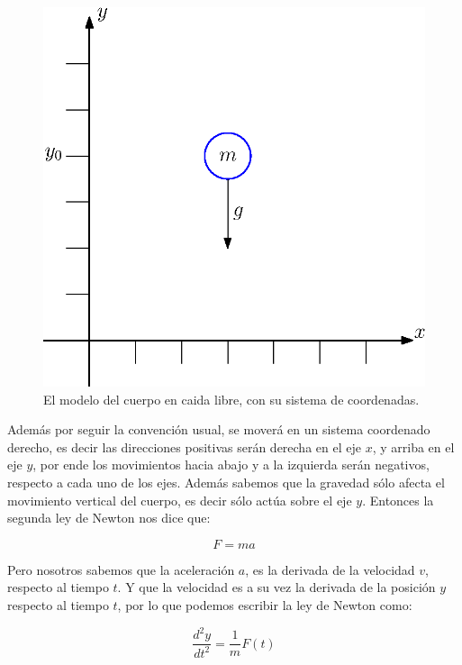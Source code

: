 \begin{figure}
 \centering
 \includegraphics[]{Img/01/cuerpo_caida}
 \caption[Diagrama de cuerpo libre]{ 
 El modelo del cuerpo en caida libre, con su sistema de coordenadas.
 } \label{cida:fig}
\end{figure}

Además por seguir la convención usual, se moverá en un sistema coordenado derecho, es decir las direcciones positivas serán derecha en el eje $x$, y arriba en el eje $y$, por ende los movimientos hacia abajo y a la izquierda serán negativos, respecto a cada uno de los ejes.
Además sabemos que la gravedad sólo afecta el movimiento vertical del cuerpo, es decir sólo actúa sobre el eje $y$.
Entonces la segunda ley de Newton nos dice que:

\begin{equation} 
F = m a
\end{equation} 

Pero nosotros sabemos que la aceleración $a$, es la derivada de la velocidad $v$, respecto al tiempo $t$.
Y que la velocidad es a su vez la derivada de la posición $y$ respecto al tiempo $t$, por lo que podemos escribir la ley de Newton como:

\begin{equation}
\label{ley:Newton}
 \frac{d^2y}{dt^2} = \frac{1}{m}F(t)
\end{equation}

